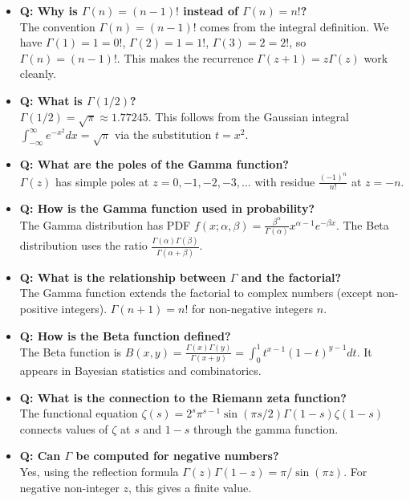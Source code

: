 \begin{itemize}
\item \textbf{Q: Why is $\Gamma(n) = (n-1)!$ instead of $\Gamma(n) = n!$?} \\
The convention $\Gamma(n) = (n-1)!$ comes from the integral definition. We have $\Gamma(1) = 1 = 0!$, $\Gamma(2) = 1 = 1!$, $\Gamma(3) = 2 = 2!$, so $\Gamma(n) = (n-1)!$. This makes the recurrence $\Gamma(z+1) = z\Gamma(z)$ work cleanly.

\item \textbf{Q: What is $\Gamma(1/2)$?} \\
$\Gamma(1/2) = \sqrt{\pi} \approx 1.77245$. This follows from the Gaussian integral $\int_{-\infty}^{\infty} e^{-x^2} dx = \sqrt{\pi}$ via the substitution $t = x^2$.

\item \textbf{Q: What are the poles of the Gamma function?} \\
$\Gamma(z)$ has simple poles at $z = 0, -1, -2, -3, \ldots$ with residue $\frac{(-1)^n}{n!}$ at $z = -n$.

\item \textbf{Q: How is the Gamma function used in probability?} \\
The Gamma distribution has PDF $f(x;\alpha, \beta) = \frac{\beta^\alpha}{\Gamma(\alpha)} x^{\alpha-1} e^{-\beta x}$. The Beta distribution uses the ratio $\frac{\Gamma(\alpha)\Gamma(\beta)}{\Gamma(\alpha+\beta)}$.

\item \textbf{Q: What is the relationship between $\Gamma$ and the factorial?} \\
The Gamma function extends the factorial to complex numbers (except non-positive integers). $\Gamma(n+1) = n!$ for non-negative integers $n$.

\item \textbf{Q: How is the Beta function defined?} \\
The Beta function is $B(x,y) = \frac{\Gamma(x)\Gamma(y)}{\Gamma(x+y)} = \int_0^1 t^{x-1}(1-t)^{y-1} dt$. It appears in Bayesian statistics and combinatorics.

\item \textbf{Q: What is the connection to the Riemann zeta function?} \\
The functional equation $\zeta(s) = 2^s \pi^{s-1} \sin(\pi s/2) \Gamma(1-s) \zeta(1-s)$ connects values of $\zeta$ at $s$ and $1-s$ through the gamma function.

\item \textbf{Q: Can $\Gamma$ be computed for negative numbers?} \\
Yes, using the reflection formula $\Gamma(z)\Gamma(1-z) = \pi/\sin(\pi z)$. For negative non-integer $z$, this gives a finite value.
\end{itemize}

